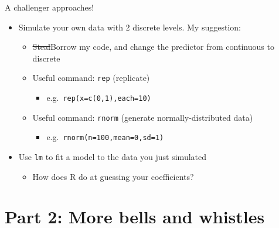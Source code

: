 \documentclass[
  ignorenonframetext,
  aspectratio=169]{beamer}
\providecommand{\tightlist}{%
  \setlength{\itemsep}{0pt}\setlength{\parskip}{0pt}}
\begin{document}
\begin{frame}[fragile]{A challenger approaches!}
\protect\hypertarget{a-challenger-approaches}{}
\begin{itemize}[<+->]
\tightlist
\item
  Simulate your own data with 2 discrete levels. My suggestion:

  \begin{itemize}[<+->]
  \tightlist
  \item
    \st{Steal}Borrow my code, and change the predictor from continuous
    to discrete
  \item
    Useful command: \texttt{rep} (replicate)

    \begin{itemize}[<+->]
    \tightlist
    \item
      e.g.~\texttt{rep(x=c(0,1),each=10)}
    \end{itemize}
  \item
    Useful command: \texttt{rnorm} (generate normally-distributed data)

    \begin{itemize}[<+->]
    \tightlist
    \item
      e.g.~\texttt{rnorm(n=100,mean=0,sd=1)}
    \end{itemize}
  \end{itemize}
\item
  Use \texttt{lm} to fit a model to the data you just simulated

  \begin{itemize}[<+->]
  \tightlist
  \item
    How does R do at guessing your coefficients?
  \end{itemize}
\end{itemize}
\end{frame}

\hypertarget{part-2-more-bells-and-whistles}{%
\section{Part 2: More bells and
whistles}\label{part-2-more-bells-and-whistles}}
\end{document}
